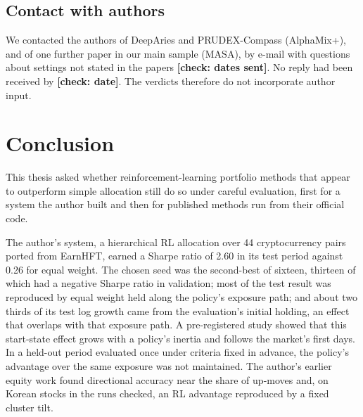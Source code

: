 \documentclass[12pt,a4paper]{report}
\begin{document}
\section{Contact with authors}\label{contact-with-authors}

We contacted the authors of DeepAries and PRUDEX-Compass (AlphaMix+),
and of one further paper in our main sample (MASA), by e-mail with
questions about settings not stated in the papers \textbf{{[}check:
dates sent{]}}. No reply had been received by \textbf{{[}check:
date{]}}. The verdicts therefore do not incorporate author input.

\chapter{Conclusion}\label{chapter-9.-conclusion}

This thesis asked whether reinforcement-learning portfolio methods that
appear to outperform simple allocation still do so under careful
evaluation, first for a system the author built and then for published
methods run from their official code.

The author's system, a hierarchical RL allocation over 44 cryptocurrency
pairs ported from EarnHFT, earned a Sharpe ratio of 2.60 in its test
period against 0.26 for equal weight. The chosen seed was the
second-best of sixteen, thirteen of which had a negative Sharpe ratio in
validation; most of the test result was reproduced by equal weight held
along the policy's exposure path; and about two thirds of its test log
growth came from the evaluation's initial holding, an effect that
overlaps with that exposure path. A pre-registered study showed that
this start-state effect grows with a policy's inertia and follows the
market's first days. In a held-out period evaluated once under criteria
fixed in advance, the policy's advantage over the same exposure was not
maintained. The author's earlier equity work found directional accuracy
near the share of up-moves and, on Korean stocks in the runs checked, an
RL advantage reproduced by a fixed cluster tilt.
\end{document}
